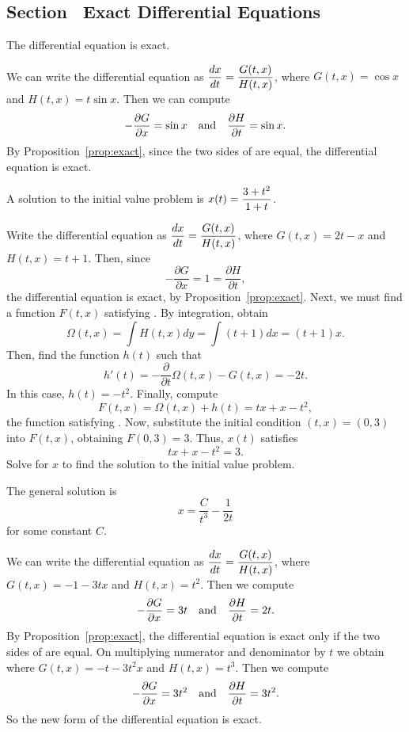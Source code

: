 \subsection*{Section~\protect{\ref{S:exact}} Exact Differential Equations}

 \ans The differential equation is exact.

\soln We can write the differential equation as $\displaystyle\frac{dx}{dt} =
\frac{G(t,x)}{H(t,x)}$, where $G(t,x) = \cos x$ and $H(t,x) = t\sin x$. 
Then we can compute
\[
-\frac{\partial G}{\partial x} = \sin x \quad\mbox{and}\quad
\frac{\partial H}{\partial t} = \sin x.
\]
By Proposition~\ref{prop:exact}, since the
two sides of  are equal, the differential equation is exact.

 \ans A solution to the initial value problem is
$x(t) = \displaystyle\frac{3 + t^2}{1 + t}$.

\soln Write the differential equation as $\displaystyle\frac{dx}{dt} =
\frac{G(t,x)}{H(t,x)}$, where $G(t,x) = 2t - x$ and $H(t,x) = t + 1$.  Then,
since
\[
-\frac{\partial G}{\partial x} = 1 = \frac{\partial H}{\partial t},
\]
the differential equation is exact, by
Proposition~\ref{prop:exact}.  Next, we must find a function $F(t,x)$
satisfying .  By integration, obtain
\[
\Omega(t,x) = \int H(t,x)dy = \int (t + 1)dx = (t + 1)x.
\]
Then, find the function $h(t)$ such that
\[
h'(t) = -\frac{\partial}{\partial t}\Omega(t,x) - G(t,x)
= -2t.
\]
In this case, $h(t) = -t^2$.  Finally, compute
\[
F(t,x) = \Omega(t,x) + h(t) = tx + x - t^2,
\]
the function satisfying .  Now, substitute the initial
condition $(t,x) = (0,3)$ into $F(t,x)$, obtaining $F(0,3) = 3$.  Thus,
$x(t)$ satisfies
\[
tx + x - t^2 = 3.
\]
Solve for $x$ to find the solution to the initial value problem.

 \ans The general solution is 
\[ x = \frac{C}{t^3} - \frac{1}{2t} \] 
for some constant $C$.

\soln We can write the differential equation as $\displaystyle\frac{dx}{dt} =
\frac{G(t,x)}{H(t,x)}$, where $G(t,x) = -1-3tx$ and $H(t,x) = t^2$. 
Then we compute
\[
-\frac{\partial G}{\partial x} = 3t \quad\mbox{and}\quad
\frac{\partial H}{\partial t} = 2t.
\]
By Proposition~\ref{prop:exact}, the
differential equation is exact only if the two sides of  are
equal.
On multiplying numerator and denominator by $t$ we obtain
where $G(t,x) = -t-3t^2x$ and $H(t,x) = t^3$. 
Then we compute
\[
-\frac{\partial G}{\partial x} = 3t^2 \quad\mbox{and}\quad
\frac{\partial H}{\partial t} = 3t^2.
\]
So the new form of the differential equation is exact.

